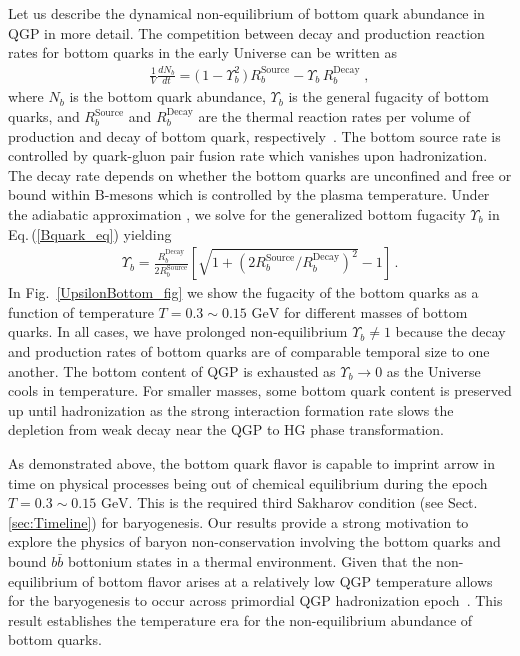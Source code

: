 \documentclass[universe,article,submit,moreauthors,pdftex,a4paper]{Definitions/mdpi}
\newcommand{\GeV}{\text{ GeV}}
\newcommand{\req}[1]{Eq.\,(\ref{#1})}
\newcommand*{\rf}[1]{Fig.~{\ref{#1}}}
\newcommand*{\rsec}[1]{Sect.\,{\ref{#1}}}
\begin{document}
Let us describe the dynamical non-equilibrium of bottom quark abundance in QGP in more detail. The competition between decay and production reaction rates for bottom quarks in the early Universe can be written as
\begin{align}
\label{Bquark_eq}
\frac{1}{V}\frac{dN_b}{dt}=\big(\,1-\Upsilon^2_{b}\,\big)\,R^{\mathrm{Source}}_{b}-\Upsilon_b\,R^{\mathrm{Decay}}_{b}\;,
\end{align}
where $N_b$ is the bottom quark abundance, $\Upsilon_b$ is the general fugacity of bottom quarks, and $R^{\mathrm{Source}}_{b}$ and $R^{\mathrm{Decay}}_{b}$ are the thermal reaction rates per volume of production and decay of bottom quark, respectively~\cite{Yang:2020nne,Yang:2023bot}. The bottom source rate is controlled by quark-gluon pair fusion rate which vanishes upon hadronization. The decay rate depends on whether the bottom quarks are unconfined and free or bound within B-mesons which is controlled by the plasma temperature. Under the adiabatic approximation %
, we solve for the generalized bottom fugacity $\Upsilon_{b}$ in \req{Bquark_eq} yielding
\begin{align}
 \Upsilon_{b}=\frac{R^{\mathrm{Decay}}_{b}}{2R^{\mathrm{Source}}_{b}}\left[\sqrt{1+\left(2R^{\mathrm{Source}}_{b}/R^{\mathrm{Decay}}_{b}\right)^2}-1\right]\,.
\end{align}
In \rf{UpsilonBottom_fig} we show the fugacity of the bottom quarks as a function of temperature $T=0.3\sim0.15\GeV$ for different masses of bottom quarks. In all cases, we have prolonged non-equilibrium $\Upsilon_{b}\neq1$ because the decay and production rates of bottom quarks are of comparable temporal size to one another. The bottom content of QGP is exhausted as $\Upsilon_{b}\rightarrow0$ as the Universe cools in temperature. For smaller masses, some bottom quark content is preserved up until hadronization as the strong interaction formation rate slows the depletion from weak decay near the QGP to HG phase transformation.

As demonstrated above, the bottom quark flavor is capable to imprint arrow in time on physical processes being out of chemical equilibrium during the epoch $T = 0.3 \sim0.15\GeV$. This is the required third Sakharov condition (see \rsec{sec:Timeline}) for baryogenesis. Our results provide a strong motivation to explore the physics of baryon non-conservation involving the bottom quarks and bound $b\bar b$ bottonium states in a thermal environment. Given that the non-equilibrium of bottom flavor arises at a relatively low QGP temperature allows for the baryogenesis to occur across primordial QGP hadronization epoch~\cite{Yang:2020nne,Yang:2023bot}. This result establishes the temperature era for the non-equilibrium abundance of bottom quarks.
\end{document}
